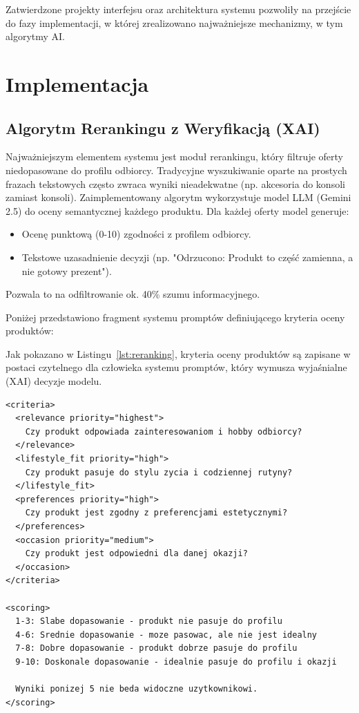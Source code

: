 \documentclass[12pt,a4paper]{article}
\begin{document}
Zatwierdzone projekty interfejsu oraz architektura systemu pozwoliły na przejście do fazy implementacji, w której zrealizowano najważniejsze mechanizmy, w tym algorytmy AI.



\section{Implementacja}

\subsection{Algorytm Rerankingu z Weryfikacją (XAI)}
Najważniejszym elementem systemu jest moduł rerankingu, który filtruje oferty niedopasowane do profilu odbiorcy. Tradycyjne wyszukiwanie oparte na prostych frazach tekstowych często zwraca wyniki nieadekwatne (np. akcesoria do konsoli zamiast konsoli). Zaimplementowany algorytm wykorzystuje model LLM (Gemini 2.5) do oceny semantycznej każdego produktu.
Dla każdej oferty model generuje:
\begin{itemize}
    \item Ocenę punktową (0-10) zgodności z profilem odbiorcy.
    \item Tekstowe uzasadnienie decyzji (np. "Odrzucono: Produkt to część zamienna, a nie gotowy prezent").
\end{itemize}
Pozwala to na odfiltrowanie ok. 40\% szumu informacyjnego.

Poniżej przedstawiono fragment systemu promptów definiującego kryteria oceny produktów:

Jak pokazano w Listingu~\ref{lst:reranking}, kryteria oceny produktów są zapisane w postaci czytelnego dla człowieka systemu promptów, który wymusza wyjaśnialne (XAI) decyzje modelu.

\begin{lstlisting}[caption={Fragment systemu promptów dla rerankingu produktów},label={lst:reranking}]
<criteria>
  <relevance priority="highest">
    Czy produkt odpowiada zainteresowaniom i hobby odbiorcy?
  </relevance>
  <lifestyle_fit priority="high">
    Czy produkt pasuje do stylu zycia i codziennej rutyny?
  </lifestyle_fit>
  <preferences priority="high">
    Czy produkt jest zgodny z preferencjami estetycznymi?
  </preferences>
  <occasion priority="medium">
    Czy produkt jest odpowiedni dla danej okazji?
  </occasion>
</criteria>

<scoring>
  1-3: Slabe dopasowanie - produkt nie pasuje do profilu
  4-6: Srednie dopasowanie - moze pasowac, ale nie jest idealny
  7-8: Dobre dopasowanie - produkt dobrze pasuje do profilu
  9-10: Doskonale dopasowanie - idealnie pasuje do profilu i okazji
  
  Wyniki ponizej 5 nie beda widoczne uzytkownikowi.
</scoring>
\end{lstlisting}
\end{document}
